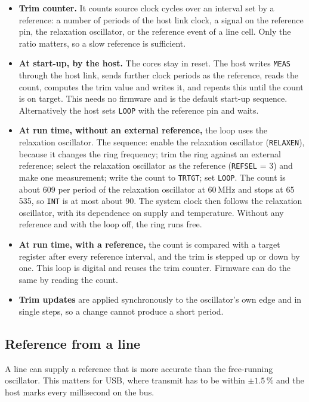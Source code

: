 \documentclass[10pt,a4paper]{article}
\newcommand{\reg}[1]{\texttt{#1}}
\begin{document}
\begin{itemize}
\item \textbf{Trim counter.} It counts source clock cycles over an interval set by a reference: a number of
periods of the host link clock, a signal on the reference pin, the relaxation oscillator, or the reference
event of a line cell. Only the ratio matters, so a slow reference is sufficient.
\item \textbf{At start-up, by the host.} The cores stay in reset. The host writes \reg{MEAS} through the host link, sends further clock periods as the reference, reads the count,
computes the trim value and writes it, and repeats this until the count is on target. This needs no firmware
and is the default start-up sequence. Alternatively the host sets \reg{LOOP} with the reference pin and waits.
\item \textbf{At run time, without an external reference,} the loop uses the relaxation oscillator. The
sequence: enable the relaxation oscillator (\reg{RELAXEN}), because it changes the ring frequency; trim the
ring against an external reference; select the relaxation oscillator as the reference (\reg{REFSEL} = 3) and
make one measurement; write the count to \reg{TRTGT}; set \reg{LOOP}. The count is about
609 per period of the relaxation oscillator at 60\,MHz and stops at 65\,535, so \reg{INT} is at most about 90.
The system clock then follows the relaxation oscillator, with its dependence on supply and temperature.
Without any reference and with the loop off, the ring runs free.
\item \textbf{At run time, with a reference,} the count is compared with a target register after every reference
interval, and the trim is stepped up or down by one. This loop is digital and reuses the trim counter. Firmware
can do the same by reading the count.
\item \textbf{Trim updates} are applied synchronously to the oscillator's own edge and in single steps, so a
change cannot produce a short period.
\end{itemize}

\subsection{Reference from a line}

A line can supply a reference that is more accurate than the free-running oscillator. This matters for USB,
where transmit has to be within $\pm 1.5\,\%$ and the host marks every millisecond on the bus.
\end{document}

